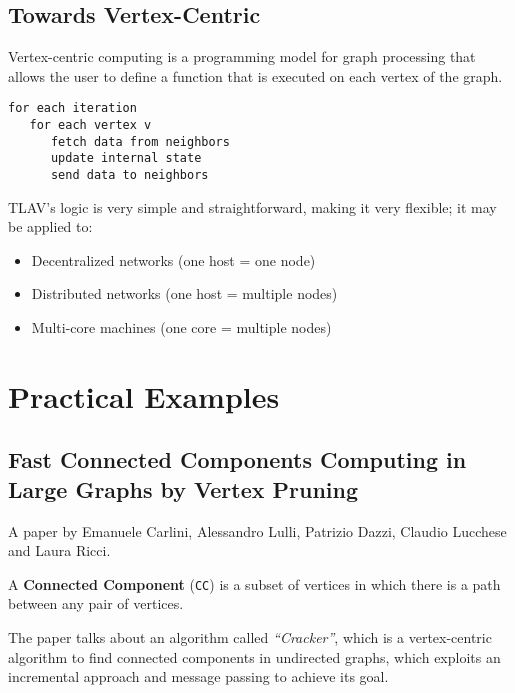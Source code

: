 
\subsection{Towards Vertex-Centric}

\begin{definition}
   Vertex-centric computing is a programming model for graph processing that allows the user to define a function that is executed on each vertex of the graph.
\end{definition}

\begin{lstlisting}[caption={TLAV in a nutshell}]
for each iteration
   for each vertex v
      fetch data from neighbors
      update internal state
      send data to neighbors
\end{lstlisting}

TLAV's logic is very simple and straightforward, making it very flexible; it may be applied to:\ns
\begin{itemize}
   \item Decentralized networks (one host = one node)
   \item Distributed networks (one host = multiple nodes)
   \item Multi-core machines (one core = multiple nodes)
\end{itemize}

\section{Practical Examples}

\subsection{Fast Connected Components Computing in Large Graphs by Vertex Pruning}
A paper by Emanuele Carlini, Alessandro Lulli, Patrizio Dazzi, Claudio Lucchese and Laura Ricci.

\begin{definition}
   A \textbf{Connected Component} (\texttt{CC}) is a subset of vertices in which there is a path between any pair of vertices.
\end{definition}

The paper talks about an algorithm called \textit{``Cracker''}, which is a vertex-centric algorithm to find connected components in undirected graphs, which exploits an incremental approach and message passing to achieve its goal.

